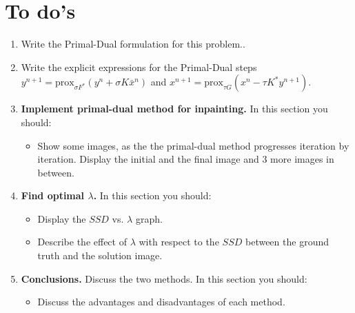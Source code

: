 \documentclass{paper}
\begin{document}
\section{To do's}
\begin{enumerate}
\item Write the Primal-Dual formulation for this problem..

\item Write the explicit expressions for the Primal-Dual steps $y^{n+1} = \text{prox}_{\sigma F^*} (y^n + \sigma K \bar{x}^n)$ and $x^{n+1} = \text{prox}_{\tau G} (x^n  - \tau K^* y^{n+1})$.


\item \textbf{Implement primal-dual method for inpainting.} In this section you should:

\begin{itemize}
\item Show some images, as the the primal-dual method progresses iteration by iteration. Display the initial and the final image and 3 more images in between.
\end{itemize}
\item \textbf{ Find optimal $\lambda$.} In this section you should:

\begin{itemize}
\item Display the $SSD$ vs. $\lambda$ graph.
\item Describe the effect of $\lambda$ with respect to the $SSD$ between the ground truth and the solution image.
\end{itemize}

\item \textbf{ Conclusions.} Discuss the two methods. In this section you should:
\begin{itemize}
\item Discuss the advantages and disadvantages of each method.
\end{itemize}
\end{enumerate}


\nocite{*}


 
\end{document}
